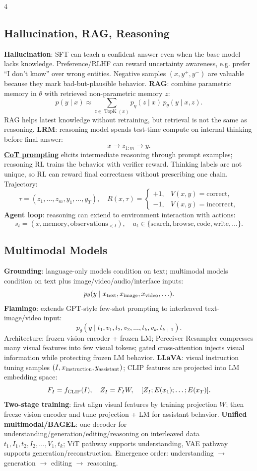 \documentclass{article}
\newcommand{\key}[1]{\textbf{#1}}
\newcommand{\lowterm}[1]{\textbf{\underline{#1}}}
\newcommand{\1}{\mathbf 1}
\begin{document}
\begin{multicols*}{4}
\subsection{Hallucination, RAG, Reasoning}
\key{Hallucination}: SFT can teach a confident answer even when the base model lacks knowledge. Preference/RLHF can reward uncertainty awareness, e.g. prefer ``I don't know'' over wrong entities. Negative samples $(x,y^+,y^-)$ are valuable because they mark bad-but-plausible behavior.
\key{RAG}: combine parametric memory in $\theta$ with retrieved non-parametric memory $z$:
\[
p(y\mid x)\approx\sum_{z\in\operatorname{TopK}(x)}
p_\eta(z\mid x)\,p_\theta(y\mid x,z).
\]
RAG helps latest knowledge without retraining, but retrieval is not the same as reasoning. \key{LRM}: reasoning model spends test-time compute on internal thinking before final answer:
\[
x\rightarrow z_{1:m}\rightarrow y.
\]
\lowterm{CoT prompting} elicits intermediate reasoning through prompt examples; reasoning RL trains the behavior with verifier reward. Thinking labels are not unique, so RL can reward final correctness without prescribing one chain. Trajectory:
\[
\tau=(z_1,\ldots,z_m,y_1,\ldots,y_T),\quad
R(x,\tau)=
\begin{cases}
+1,&V(x,y)=\text{correct},\\
-1,&V(x,y)=\text{incorrect},
\end{cases}
\]
\key{Agent loop}: reasoning can extend to environment interaction with actions:
\[
s_t=(x,\text{memory},\text{observations}_{<t}),\quad
a_t\in\{\text{search},\text{browse},\text{code},\text{write},\ldots\}.
\]

\subsection{Multimodal Models}
\key{Grounding}: language-only models condition on text; multimodal models condition on text plus image/video/audio/interface inputs:
\[
p_\theta(y\mid x_{\rm text},x_{\rm image},x_{\rm video},\ldots).
\]
\key{Flamingo}: extends GPT-style few-shot prompting to interleaved text-image/video input:
\[
p_\theta(y\mid t_1,v_1,t_2,v_2,\ldots,t_k,v_k,t_{k+1}).
\]
Architecture: frozen vision encoder + frozen LM; Perceiver Resampler compresses many visual features into few visual tokens; gated cross-attention injects visual information while protecting frozen LM behavior. \key{LLaVA}: visual instruction tuning samples $(I,x_{\rm instruction},y_{\rm assistant})$; CLIP features are projected into LM embedding space:
\[
F_I=f_{\rm CLIP}(I),\quad Z_I=F_IW,\quad [Z_I;E(x_1);\ldots;E(x_T)].
\]
\key{Two-stage training}: first align visual features by training projection $W$; then freeze vision encoder and tune projection + LM for assistant behavior. \key{Unified multimodal/BAGEL}: one decoder for understanding/generation/editing/reasoning on interleaved data $t_1,I_1,t_2,I_2,\ldots,V_1,t_k$; ViT pathway supports understanding, VAE pathway supports generation/reconstruction. Emergence order: understanding $\to$ generation $\to$ editing $\to$ reasoning.



\end{multicols*}
\end{document}
